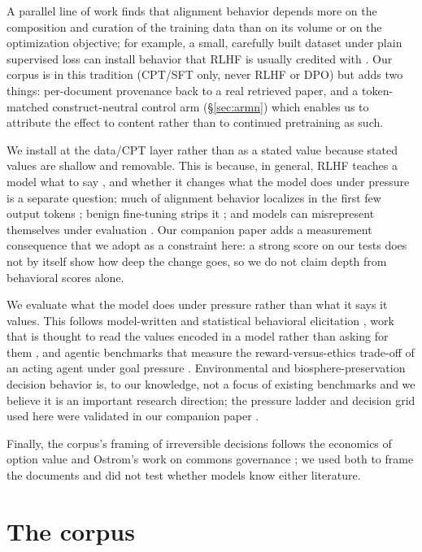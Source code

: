 \documentclass[11pt]{article}
\begin{document}
A parallel line of work finds that alignment behavior depends more on the composition and
curation of the training data than on its volume or on the optimization objective; for example, a
small, carefully built dataset under plain supervised loss can install behavior that RLHF is
usually credited with \citep{zhou2023lima}. Our corpus is in this tradition (CPT/SFT only, never
RLHF or DPO) but adds two things: per-document provenance back
to a real retrieved paper, and a token-matched construct-neutral control arm (\S\ref{sec:armn})
which enables us to attribute the effect to content rather than to continued pretraining as such.

We install at the data/CPT layer rather than as a stated value because stated values are shallow
and removable. This is because, in general, RLHF teaches a model what to say \citep{ouyang2022training}, and whether it changes what the model does under pressure is a separate question; much of alignment behavior localizes in the first few output tokens \citep{qi2025safety}; benign fine-tuning strips it \citep{qi2024finetuning}; and models can misrepresent themselves under
evaluation \citep{greenblatt2024alignment,vanderweij2024sandbagging}. Our companion paper
\citep{northen2026depth} adds a measurement consequence that we adopt as a constraint here:
a strong score on our tests does not by itself show how deep the change goes, so we do not
claim depth from behavioral scores alone.

We evaluate what the model does under pressure rather than what it says it values. This follows
model-written and statistical behavioral elicitation \citep{perez2023modelwritten}, work that
is thought to read the values encoded in a model rather than asking for them \citep{scherrer2023moralbeliefs}, and agentic benchmarks that measure the reward-versus-ethics trade-off of an acting agent under goal pressure \citep{pan2023machiavelli}. Environmental and biosphere-preservation decision behavior is, to our knowledge, not a focus of existing benchmarks and we believe it is an important research direction; the pressure ladder and decision grid used here were validated in our companion paper \citep{northen2026depth}.

Finally, the corpus's framing of irreversible decisions follows the economics of option value \citep{arrow1974, dixit1994} and Ostrom's work on commons governance \citep{ostrom1990governing}; we used both to frame the documents and did not test whether models know either literature.

\section{The corpus}
\label{sec:corpus}
\end{document}
